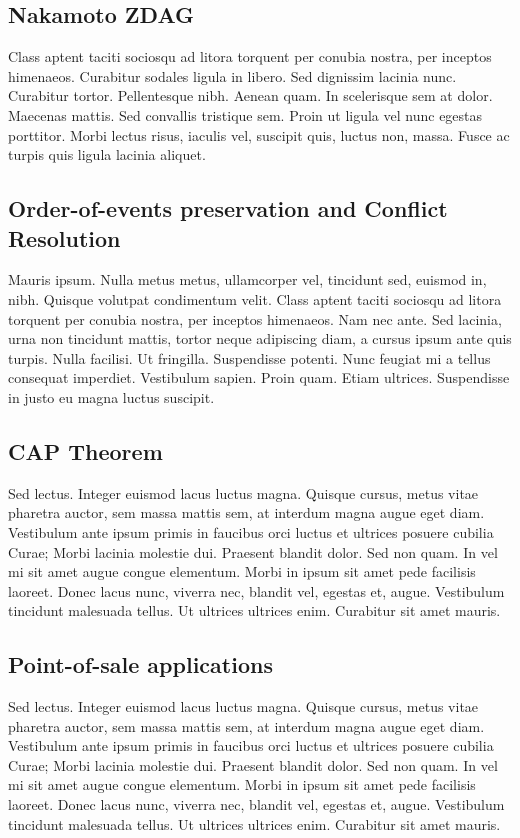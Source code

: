 \documentclass[peerreview]{ieeesyscoin}
\begin{document}
\subsection{Nakamoto ZDAG}
Class aptent taciti sociosqu ad litora torquent per conubia nostra, per inceptos himenaeos. Curabitur sodales ligula in libero. Sed dignissim lacinia nunc. Curabitur tortor. Pellentesque nibh. Aenean quam. In scelerisque sem at dolor. Maecenas mattis. Sed convallis tristique sem. Proin ut ligula vel nunc egestas porttitor. Morbi lectus risus, iaculis vel, suscipit quis, luctus non, massa. Fusce ac turpis quis ligula lacinia aliquet. 

\subsection{Order-of-events preservation and Conflict Resolution}
Mauris ipsum. Nulla metus metus, ullamcorper vel, tincidunt sed, euismod in, nibh. Quisque volutpat condimentum velit. Class aptent taciti sociosqu ad litora torquent per conubia nostra, per inceptos himenaeos. Nam nec ante. Sed lacinia, urna non tincidunt mattis, tortor neque adipiscing diam, a cursus ipsum ante quis turpis. Nulla facilisi. Ut fringilla. Suspendisse potenti. Nunc feugiat mi a tellus consequat imperdiet. Vestibulum sapien. Proin quam. Etiam ultrices. Suspendisse in justo eu magna luctus suscipit. 


\subsection{CAP Theorem}
Sed lectus. Integer euismod lacus luctus magna. Quisque cursus, metus vitae pharetra auctor, sem massa mattis sem, at interdum magna augue eget diam. Vestibulum ante ipsum primis in faucibus orci luctus et ultrices posuere cubilia Curae; Morbi lacinia molestie dui. Praesent blandit dolor. Sed non quam. In vel mi sit amet augue congue elementum. Morbi in ipsum sit amet pede facilisis laoreet. Donec lacus nunc, viverra nec, blandit vel, egestas et, augue. Vestibulum tincidunt malesuada tellus. Ut ultrices ultrices enim. Curabitur sit amet mauris. 

\subsection{Point-of-sale applications}
Sed lectus. Integer euismod lacus luctus magna. Quisque cursus, metus vitae pharetra auctor, sem massa mattis sem, at interdum magna augue eget diam. Vestibulum ante ipsum primis in faucibus orci luctus et ultrices posuere cubilia Curae; Morbi lacinia molestie dui. Praesent blandit dolor. Sed non quam. In vel mi sit amet augue congue elementum. Morbi in ipsum sit amet pede facilisis laoreet. Donec lacus nunc, viverra nec, blandit vel, egestas et, augue. Vestibulum tincidunt malesuada tellus. Ut ultrices ultrices enim. Curabitur sit amet mauris. 
\end{document}
